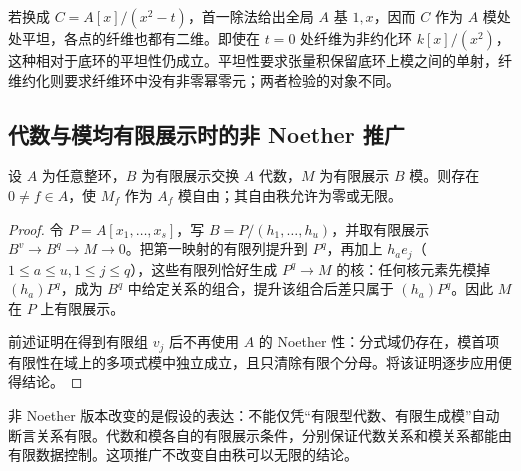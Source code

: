 若换成 \(C=A[x]/(x^2-t)\)，首一除法给出全局 \(A\) 基 \(1,x\)，因而 \(C\) 作为 \(A\) 模处处平坦，各点的纤维也都有二维。即使在 \(t=0\) 处纤维为非约化环 \(k[x]/(x^2)\)，这种相对于底环的平坦性仍成立。平坦性要求张量积保留底环上模之间的单射，纤维约化则要求纤维环中没有非零幂零元；两者检验的对象不同。

\subsection{代数与模均有限展示时的非 Noether 推广}
\label{b3:subsec:1204:05}

\begin{proposition}\label{b3:prop:generic-free-finite-presentation}
	设 \(A\) 为任意整环，\(B\) 为有限展示交换 \(A\) 代数，\(M\) 为有限展示 \(B\) 模。则存在 \(0\ne f\in A\)，使 \(M_f\) 作为 \(A_f\) 模自由；其自由秩允许为零或无限。
\end{proposition}
\begin{proof}
	令 \(P=A[x_1,\ldots,x_s]\)，写 \(B=P/(h_1,\ldots,h_u)\)，并取有限展示 \(B^v\to B^q\to M\to0\)。把第一映射的有限列提升到 \(P^q\)，再加上 \(h_a e_j\)（\(1\le a\le u,1\le j\le q\)），这些有限列恰好生成 \(P^q\to M\) 的核：任何核元素先模掉 \((h_a)P^q\)，成为 \(B^q\) 中给定关系的组合，提升该组合后差只属于 \((h_a)P^q\)。因此 \(M\) 在 \(P\) 上有限展示。

	前述证明在得到有限组 \(v_j\) 后不再使用 \(A\) 的 Noether 性：分式域仍存在，模首项有限性在域上的多项式模中独立成立，且只清除有限个分母。将该证明逐步应用便得结论。
\end{proof}

非 Noether 版本改变的是假设的表达：不能仅凭“有限型代数、有限生成模”自动断言关系有限。代数和模各自的有限展示条件，分别保证代数关系和模关系都能由有限数据控制。这项推广不改变自由秩可以无限的结论。
